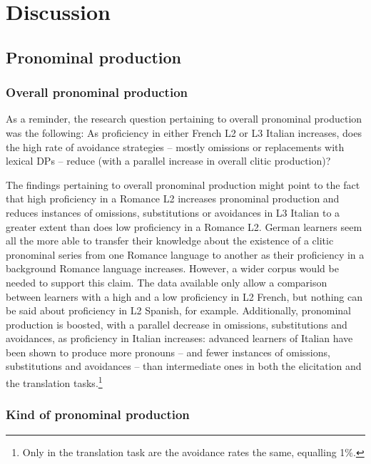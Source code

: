 \documentclass[output=paper,modfonts,nonflat,newtxmath]{langsci/langscibook}
\begin{document}
\section{Discussion} %
\label{sec:sciutti:5}

\subsection{Pronominal production} %
\label{sec:sciutti:5.1}

\subsubsection{Overall {pronominal} production} %

As a reminder, the research question pertaining to overall pronominal production was the following: As proficiency in either French L2 or L3 Italian increases, does the high rate of avoidance strategies – mostly omissions or replacements with lexical DPs – reduce (with a parallel increase in overall clitic production)?

The findings pertaining to overall pronominal production might point to the fact that high proficiency in a Romance L2 increases pronominal production and reduces instances of omissions, substitutions or avoidances in L3 Italian to a greater extent than does low proficiency in a Romance L2. German learners seem all the more able to transfer their knowledge about the existence of a clitic pronominal series from one Romance language to another as their proficiency in a background Romance language increases. However, a wider corpus would be needed to support this claim. The data available only allow a comparison between learners with a high and a low proficiency in L2 French, but nothing can be said about proficiency in L2 Spanish, for example. Additionally, pronominal production is boosted, with a parallel decrease in omissions, substitutions and avoidances, as proficiency in Italian increases: advanced learners of Italian have been shown to produce more pronouns – and fewer instances of omissions, substitutions and avoidances – than intermediate ones in both the elicitation and the translation tasks.\footnote{Only in the translation task are the avoidance rates the same, equalling 1\%.}

\subsubsection{Kind of pronominal production} %
\end{document}
